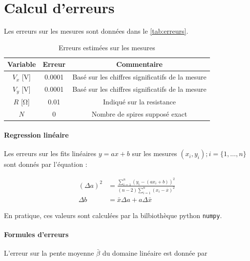 \section{Calcul d'erreurs}
\label{sec:erreurs}

Les erreurs sur les mesures sont données dans le \autoref{tab:erreurs}.

\begin{table}[h]
    \centering
    \begin{tabulary}{\textwidth}{C C C}
        \toprule
        Variable & Erreur & Commentaire \\
        \midrule
        \(V_x\) [\si{\volt}] & 0.0001 & Basé sur les chiffres significatifs de la mesure \\
        \(V_y\) [\si{\volt}] & 0.0001 & Basé sur les chiffres significatifs de la mesure \\
        \(R\) [\si{\ohm}] & 0.01 & Indiqué sur la resistance \\
        \(N\) & 0 & Nombre de spires supposé exact \\
        \bottomrule
    \end{tabulary}
    \caption{Erreurs estimées sur les mesures}
    \label{tab:erreurs}
\end{table}

\paragraph*{Regression linéaire}
Les erreurs sur les fits linéaires \(y = ax + b\) sur les mesures \((x_i, y_i) ; i = \{1, \hdots, n\}\) sont donnés par l'équation \cite{erreursmesure}:

\begin{equation}
    \label{eq:erreur:fit}
    \begin{aligned}
        (\Delta a)^2 &= \frac{\sum_{i=1}^{n}(y_i - (a x_i + b))^2}{(n-2) \sum_{i=1}^{n}(x_i - \bar{x})^2}\\
        \Delta b &= \bar{x} \Delta a + a \Delta \bar{x}
    \end{aligned}
\end{equation}

En pratique, ces valeurs sont calculées par la bilbiothèque python \texttt{numpy}.

\paragraph*{Formules d'erreurs}
L'erreur sur la pente moyenne \(\bar{\beta}\) du domaine linéaire est donnée par

